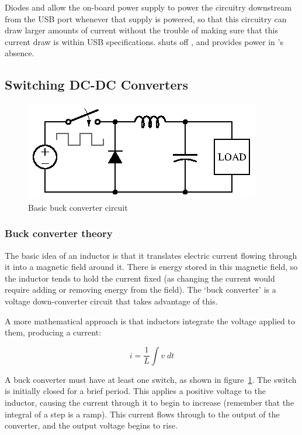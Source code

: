 Diodes  and  allow the on-board power supply to power
the circuitry downstream from the USB port whenever that supply is powered,
so that this circuitry can draw larger amounts of current without the trouble
of making sure that this current draw is within USB specifications.
 shuts off , and  provides power in
's absence.


\subsection{Switching DC-DC Converters}


\begin{figure}[H]
\centering
\includegraphics{too/buckconv}
\caption{Basic buck converter circuit}
\label{fig:basicbuck}
\end{figure}

\subsubsection{Buck converter theory}

The basic idea of an inductor is that it translates electric current flowing
through it into a magnetic field around it. There is energy stored in this
magnetic field, so the inductor tends to hold the current fixed (as changing
the current would require adding or removing energy from the field). The
`buck converter' is a voltage down-converter circuit that takes advantage
of this.

A more mathematical approach is that inductors integrate the voltage applied
to them, producing a current:

\begin{equation*}
    i = \frac{1}{L} \int v\;dt
\end{equation*}

A buck converter must have at least one switch, as shown in
figure~\ref{fig:basicbuck}.  The switch is initially closed for a brief period.
This applies a positive voltage to the inductor, causing the current through it
to begin to increase (remember that the integral of a step is a ramp). This
current flows through to the output of the converter, and the output voltage
begins to rise.

